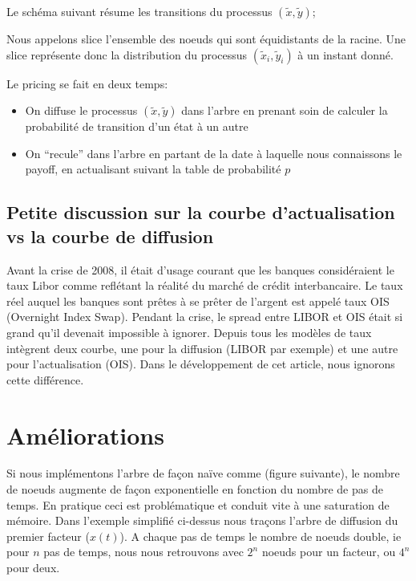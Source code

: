 Le schéma suivant résume les transitions du processus {$(\widetilde{x}, \widetilde{y})$};



Nous appelons slice l'ensemble des noeuds qui sont équidistants de la racine. Une slice représente donc la distribution du processus $( \widetilde{x}_i, \widetilde{y}_i)$ à un instant donné.

Le pricing se fait en deux temps:
\begin{itemize}
\item On diffuse le processus $(\widetilde{x}, \widetilde{y})$ dans l'arbre en prenant soin de calculer la probabilité de transition d'un état à un autre
\item On ``recule'' dans l'arbre en partant de la date à laquelle nous connaissons le payoff, en actualisant suivant la table de probabilité $p$
\end{itemize}

  \subsection*{Petite discussion sur la courbe d'actualisation vs la courbe de diffusion}
  Avant la crise de 2008, il était d'usage courant que les banques considéraient le taux Libor comme reflétant la réalité du marché de crédit interbancaire. Le taux réel auquel les banques sont prêtes à se prêter de l'argent est appelé taux OIS (Overnight Index Swap).  
Pendant la crise, le spread entre LIBOR et OIS était si grand qu'il devenait impossible à ignorer. Depuis tous les modèles de taux intègrent deux courbe, une pour la diffusion (LIBOR par exemple) et une autre pour l'actualisation (OIS).
Dans le développement de cet article, nous ignorons cette différence.
  
\section{Améliorations}

Si nous implémentons l'arbre de façon naïve comme (figure suivante), le nombre de noeuds augmente de façon exponentielle en fonction du nombre de pas de temps. En pratique ceci est problématique et conduit vite à une saturation de mémoire. Dans l'exemple simplifié ci-dessus nous traçons l'arbre de diffusion du premier facteur ($x(t)$). A chaque pas de temps le nombre de noeuds double, ie pour $n$ pas de temps, nous nous retrouvons avec $2^n$ noeuds pour un facteur, ou $4^n$ pour deux. 

